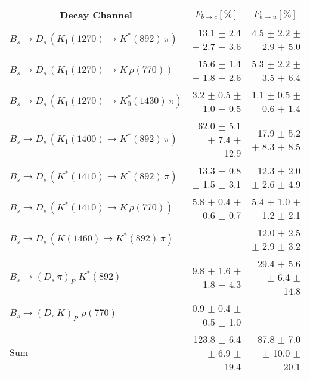 \begin{tabular}{l r r } 
\hline
\hline
\multicolumn{1}{c}{Decay Channel} & \multicolumn{1}{c}{$F_{b \to c} [\%]$} & \multicolumn{1}{c}{$F_{b \to u} [\%]$}  \\ 
\hline
$B_s \to D_s \, ( K_1(1270) \to K^{*}(892) \, \pi )$ & 13.1 $\pm$ 2.4 $\pm$ 2.7 $\pm$ 3.6 & 4.5 $\pm$ 2.2 $\pm$ 2.9 $\pm$ 5.0 \\ 
$B_s \to D_s \, ( K_1(1270) \to K \, \rho(770) )$ & 15.6 $\pm$ 1.4 $\pm$ 1.8 $\pm$ 2.6 & 5.3 $\pm$ 2.2 $\pm$ 3.5 $\pm$ 6.4 \\ 
$B_s \to D_s \, ( K_1(1270) \to K^{*}_{0}(1430) \, \pi )$ & 3.2 $\pm$ 0.5 $\pm$ 1.0 $\pm$ 0.5 & 1.1 $\pm$ 0.5 $\pm$ 0.6 $\pm$ 1.4 \\ 
$B_s \to D_s \, ( K_1(1400) \to K^{*}(892) \, \pi )$ & 62.0 $\pm$ 5.1 $\pm$ 7.4 $\pm$ 12.9 & 17.9 $\pm$ 5.2 $\pm$ 8.3 $\pm$ 8.5 \\ 
$B_s \to D_s \, ( K^{*}(1410) \to K^{*}(892) \, \pi )$ & 13.3 $\pm$ 0.8 $\pm$ 1.5 $\pm$ 3.1 & 12.3 $\pm$ 2.0 $\pm$ 2.6 $\pm$ 4.9 \\ 
$B_s \to D_s \, ( K^{*}(1410) \to K \, \rho(770) )$ & 5.8 $\pm$ 0.4 $\pm$ 0.6 $\pm$ 0.7 & 5.4 $\pm$ 1.0 $\pm$ 1.2 $\pm$ 2.1 \\ 
$B_s \to D_s \, ( K(1460) \to K^{*}(892) \, \pi )$ &  & 12.0 $\pm$ 2.5 $\pm$ 2.9 $\pm$ 3.2 \\ 
$B_s \to ( D_s \, \pi)_{P} \, \, K^{*}(892)$ & 9.8 $\pm$ 1.6 $\pm$ 1.8 $\pm$ 4.3 & 29.4 $\pm$ 5.6 $\pm$ 6.4 $\pm$ 14.8 \\ 
$B_s \to ( D_s \, K)_{P} \, \, \rho(770)$ & 0.9 $\pm$ 0.4 $\pm$ 0.5 $\pm$ 1.0 &  \\ 
\hline
$\text{Sum}$ & 123.8 $\pm$ 6.4 $\pm$ 6.9 $\pm$ 19.4 & 87.8 $\pm$ 7.0 $\pm$ 10.0 $\pm$ 20.1 \\ 
\hline
\hline
\end{tabular}
